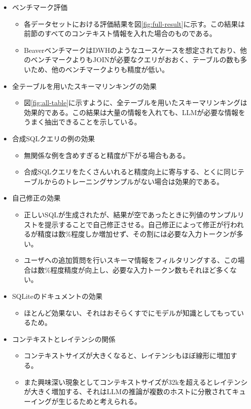 \documentclass[dvipdfmx,uplatex]{jsarticle}
\theoremstyle{remark}
\newenvironment{experiment}[1]{
    \begin{tcolorbox}[
        colframe=violet,
        colback=violet!10!white,
        colbacktitle=violet!40!white,
        coltitle=black,
        fonttitle=\bfseries,
        title={#1}
    ]
}{
    \end{tcolorbox}
}
\begin{document}
\begin{experiment}{実験結果}
\begin{itemize}
    \item ベンチマーク評価
    \begin{itemize}
        \item 各データセットにおける評価結果を図\ref{fig:full-result}に示す。この結果は前節のすべてのコンテキスト情報を入れた場合のものである。
        \item BeaverベンチマークはDWHのようなユースケースを想定されており、他のベンチマークよりもJOINが必要なクエリがおおく、テーブルの数も多いため、他のベンチマークよりも精度が低い。
    \end{itemize}
    \item 全テーブルを用いたスキーマリンキングの効果
    \begin{itemize}
        \item 図\ref{fig:all-table}に示すように、全テーブルを用いたスキーマリンキングは効果的である。この結果は大量の情報を入れても、LLMが必要な情報をうまく抽出できることを示している。
    \end{itemize}
    \item 合成SQLクエリの例の効果
    \begin{itemize}
        \item 無関係な例を含めすぎると精度が下がる場合もある。
        \item 合成SQLクエリをたくさんいれると精度向上に寄与する、とくに同じテーブルからのトレーニングサンプルがない場合は効果的である。
    \end{itemize}
    \item 自己修正の効果
    \begin{itemize}
        \item 正しいSQLが生成されたが、結果が空であったときに列値のサンプルリストを提示することで自己修正させる。自己修正によって修正が行われるが精度は数\%程度しか増加せず、その割には必要な入力トークンが多い。
        \item ユーザへの追加質問を行いスキーマ情報をフィルタリングする、この場合は数\%程度精度が向上し、必要な入力トークン数もそれほど多くない。
    \end{itemize}
    \item SQLiteのドキュメントの効果
    \begin{itemize}
        \item ほとんど効果ない、それはおそらくすでにモデルが知識としてもっているため。
    \end{itemize}
    \item コンテキストとレイテンシの関係
    \begin{itemize}
        \item コンテキストサイズが大きくなると、レイテンシもほぼ線形に増加する。
        \item また興味深い現象としてコンテキストサイズが32kを超えるとレイテンシが大きく増加する、それはLLMの推論が複数のホストに分散されてキューイングが生じるためと考えられる。
    \end{itemize}
\end{itemize}
\end{experiment}
\end{document}
